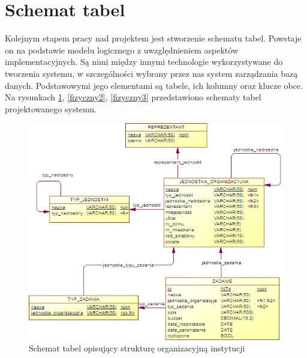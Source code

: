 \section[Schemat tabel][Schemat tabel]{Schemat tabel}
\label{modelFizyczny}
Kolejnym etapem pracy nad projektem jest stworzenie schematu tabel. Powstaje on na podstawie modelu logicznego z uwzględnieniem aspektów implementacyjnych. Są nimi między innymi technologie wykorzystywane do tworzenia systemu, w szczególności wybrany przez nas system zarządzania bazą danych. Podstawowymi jego elementami są tabele, ich kolumny oraz klucze obce. Na rysunkach \ref{fizyczny1}, \ref{fizyczny2}, \ref{fizyczny3} przedstawiono schematy tabel projektowanego systemu.



\begin{figure}[tdh]
    \begin{center}
	\includegraphics[scale=1]{img/fizyczny1.png}
	\caption{Schemat tabel opisujący strukturę organizacyjną instytucji}
	\label{fizyczny1}
    \end{center}
\end{figure}

